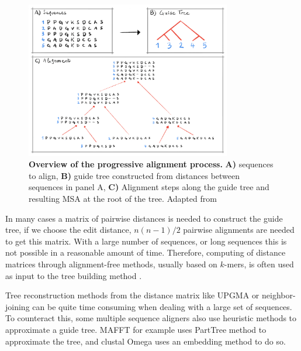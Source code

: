 \documentclass[
  11pt,
  twoside,
  BCOR=10mm,
  listof=totoc]{scrbook}
\newcommand{\extcaption}[2]{
    \caption[#1]{
        \textbf{#1}\newline
        #2
    }
}
\begin{document}
\begin{figure}[h]
\centering
\includegraphics[width=0.8\textwidth]{./figures/Align-Intro/progressive.png}
\extcaption{Overview of the progressive alignment process.}{\textbf{A)} sequences to align, \textbf{B)} guide tree constructed from distances between sequences in panel A, \textbf{C)} Alignment steps along the guide tree and resulting MSA at the root of the tree. Adapted from \autocite{sungAlgorithmsBioinformaticsPractical2011}}
\label{fig:progAlign}
\end{figure}

In many cases a matrix of pairwise distances is needed to construct the guide tree, if we choose the edit distance, \(n(n-1)/2\) pairwise alignments are needed to get this matrix. With a large number of sequences, or long sequences this is not possible in a reasonable amount of time. Therefore, computing of distance matrices through alignment-free methods, usually based on \(k\)-mers, is often used as input to the tree building method \autocite{jonesRapidGenerationMutation1992,blaisdellMeasureSimilaritySets1986}.

Tree reconstruction methods from the distance matrix like UPGMA \autocite{gronauOptimalImplementationsUPGMA2007} or neighbor-joining \autocite{saitouNeighborjoiningMethodNew1987} can be quite time consuming when dealing with a large set of sequences. To counteract this, some multiple sequence aligners also use heuristic methods to approximate a guide tree. MAFFT \autocite{katohMAFFTNovelMethod2002} for example uses PartTree \autocite{katohPartTreeAlgorithmBuild2007} method to approximate the tree, and clustal Omega \autocite{sieversFastScalableGeneration2011} uses an embedding method \autocite{blackshieldsSequenceEmbeddingFast2010} to do so.
\end{document}
